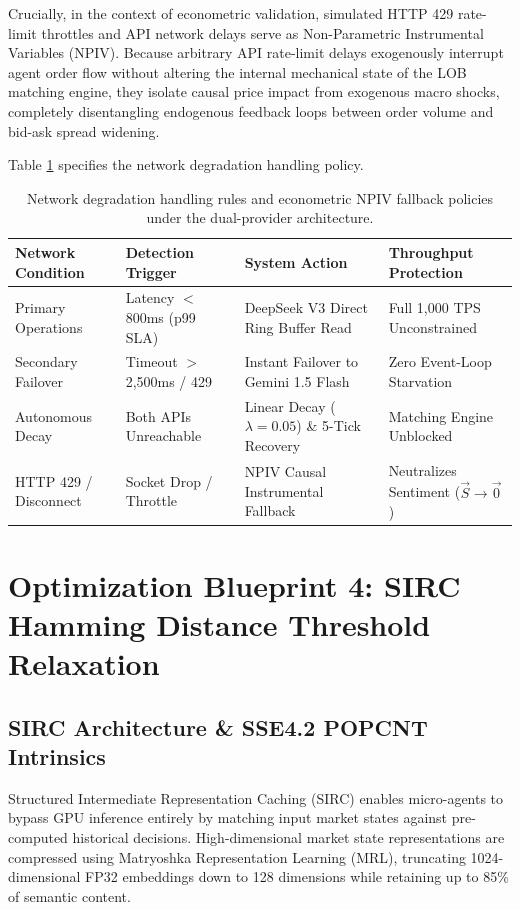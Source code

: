 Crucially, in the context of econometric validation, simulated HTTP 429 rate-limit throttles and API network delays serve as Non-Parametric Instrumental Variables (NPIV). Because arbitrary API rate-limit delays exogenously interrupt agent order flow without altering the internal mechanical state of the LOB matching engine, they isolate causal price impact from exogenous macro shocks, completely disentangling endogenous feedback loops between order volume and bid-ask spread widening.

Table \ref{tab:network_degradation_matrix} specifies the network degradation handling policy.

\begin{table}[htbp]
\centering
\small
\begin{tabularx}{\textwidth}{l p{2.6cm} p{2.8cm} X}
\toprule
\textbf{Network Condition} & \textbf{Detection Trigger} & \textbf{System Action} & \textbf{Throughput Protection} \\
\midrule
Primary Operations & Latency $<$ 800ms (p99 SLA) & DeepSeek V3 Direct Ring Buffer Read & Full 1,000 TPS Unconstrained \\
Secondary Failover & Timeout $>$ 2,500ms / 429 & Instant Failover to Gemini 1.5 Flash & Zero Event-Loop Starvation \\
Autonomous Decay & Both APIs Unreachable & Linear Decay ($\lambda = 0.05$) \& 5-Tick Recovery & Matching Engine Unblocked \\
HTTP 429 / Disconnect & Socket Drop / Throttle & NPIV Causal Instrumental Fallback & Neutralizes Sentiment ($\vec{S} \to \vec{0}$) \\
\bottomrule
\end{tabularx}
\caption{Network degradation handling rules and econometric NPIV fallback policies under the dual-provider architecture.}
\label{tab:network_degradation_matrix}
\end{table}

\section{Optimization Blueprint 4: SIRC Hamming Distance Threshold Relaxation}

\subsection{SIRC Architecture \& SSE4.2 POPCNT Intrinsics}

Structured Intermediate Representation Caching (SIRC) enables micro-agents to bypass GPU inference entirely by matching input market states against pre-computed historical decisions. High-dimensional market state representations are compressed using Matryoshka Representation Learning (MRL), truncating 1024-dimensional FP32 embeddings down to 128 dimensions while retaining up to 85\% of semantic content.

